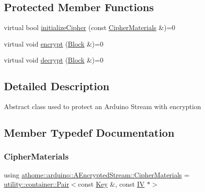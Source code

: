 \subsection*{Protected Member Functions}
\begin{DoxyCompactItemize}
\item 
virtual bool \mbox{\hyperlink{classathome_1_1arduino_1_1_a_encrypted_stream_a7b167d800f8ccb734228ed8e5b09d553}{initialize\+Cipher}} (const \mbox{\hyperlink{classathome_1_1arduino_1_1_a_encrypted_stream_a67d68ce9b0daa19296b38c9bb3a5aee7}{Cipher\+Materials}} \&)=0
\item 
virtual void \mbox{\hyperlink{classathome_1_1arduino_1_1_a_encrypted_stream_a823ec054953b2f239a4bdbbc691ed984}{encrypt}} (\mbox{\hyperlink{structathome_1_1arduino_1_1_a_encrypted_stream_1_1_block}{Block}} \&)=0
\item 
virtual void \mbox{\hyperlink{classathome_1_1arduino_1_1_a_encrypted_stream_a256c8946f3907cea6cd2dc73e971acd2}{decrypt}} (\mbox{\hyperlink{structathome_1_1arduino_1_1_a_encrypted_stream_1_1_block}{Block}} \&)=0
\end{DoxyCompactItemize}


\subsection{Detailed Description}
Abstract class used to protect an Arduino Stream with encryption 

\subsection{Member Typedef Documentation}
\mbox{\label{classathome_1_1arduino_1_1_a_encrypted_stream_a67d68ce9b0daa19296b38c9bb3a5aee7}} 
\subsubsection{\texorpdfstring{Cipher\+Materials}{CipherMaterials}}
{\footnotesize\ttfamily using \mbox{\hyperlink{classathome_1_1arduino_1_1_a_encrypted_stream_a67d68ce9b0daa19296b38c9bb3a5aee7}{athome\+::arduino\+::\+A\+Encrypted\+Stream\+::\+Cipher\+Materials}} =  \mbox{\hyperlink{classathome_1_1utility_1_1container_1_1_pair}{utility\+::container\+::\+Pair}}$<$const \mbox{\hyperlink{classathome_1_1arduino_1_1_a_encrypted_stream_a2f0fd4a9c2a74a4ae857a4447aa3956f}{Key}} \&, const \mbox{\hyperlink{classathome_1_1arduino_1_1_a_encrypted_stream_a4a0c027bc7503bb0da538d6a2f0657e6}{IV}} $\ast$$>$\hspace{0.3cm}{\ttfamily [protected]}}

